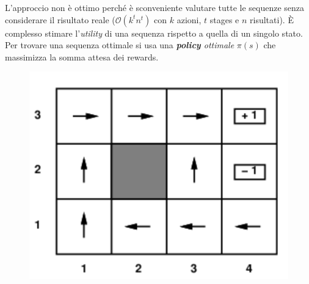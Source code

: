 \documentclass[a4paper, notitlepage, 9pt]{extreport}
\begin{document}
\begin{multicols}{2}
	\noindent
	L'approccio non è ottimo perché è sconveniente valutare tutte le sequenze senza considerare il risultato reale ($\mathcal{O}(k^t n^t)$ con $k$ azioni, $t$ stages e $n$ risultati). È complesso stimare l'\textit{utility} di una sequenza rispetto a quella di un singolo stato.\\
	Per trovare una sequenza ottimale si usa una \textit{\textbf{policy} ottimale} $\pi(s)$ che massimizza la somma attesa dei rewards.
	\columnbreak
	\begin{figure}[H]
		\centering
		\includegraphics[scale=0.25]{Maze2}
	\end{figure}
\end{multicols}
\end{document}

